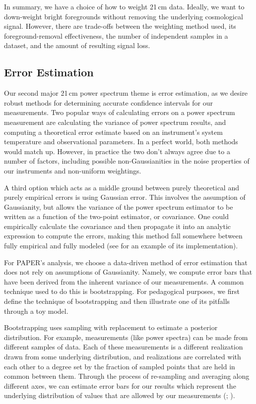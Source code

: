 \documentclass[preprint2,numberedappendix,tighten]{aastex6}  %
\begin{document}
In summary, we have a choice of how to weight 21\,cm data. Ideally, we want to down-weight bright foregrounds without 
removing the underlying cosmological signal. However, there are trade-offs between the weighting method 
used, its foreground-removal effectiveness, the number of independent samples in a dataset, and the amount of resulting signal loss. 


\subsection{Error Estimation}
\label{sec:ErrorOverview}

Our second major 21\,cm power spectrum theme is error estimation, as we desire robust methods for determining accurate 
confidence intervals for our measurements. Two popular ways of calculating errors on a power spectrum 
measurement are calculating the variance of power spectrum results, and computing a theoretical error estimate based on an instrument's 
system temperature and observational parameters. In a perfect world, both methods would match up. However, in practice the 
two don't always agree due to a number of factors, including possible non-Gaussianities in the noise properties of our instruments and non-uniform 
weightings. 

A third option which acts as a middle ground between purely theoretical and purely empirical errors is using Gaussian error. This involves the assumption of Gaussianity, but allows the variance of the power spectrum estimator to be written as a function of the two-point estimator, or covariance. One could empirically calculate the covariance and then propagate it into an analytic expression to compute the errors, making this method fall somewhere between fully empirical and fully modeled (see \citet{das_et_al2011a} for an example of its implementation). 

For PAPER's analysis, we choose a data-driven method of error estimation that does not rely on assumptions of Gaussianity. Namely, we compute error bars that have been derived from the inherent 
variance of our measurements. A common technique used to do this is bootstrapping. For pedagogical purposes, we first define the technique of 
bootstrapping and then illustrate one of its pitfalls through a toy model.

Bootstrapping uses sampling with replacement to estimate a posterior distribution. For example, measurements (like power 
spectra) can be made from different samples of data. Each of these measurements is a different realization drawn from some underlying distribution, and realizations are correlated with each other to a degree set by the fraction of sampled points that are held in common 
between them. Through the process of re-sampling and averaging along different axes, we can estimate error bars for 
our results which represent the underlying distribution of values that are allowed by our measurements (\citealt{efron_tibshirani1994}; \citealt{andrae2010}).
\end{document}
